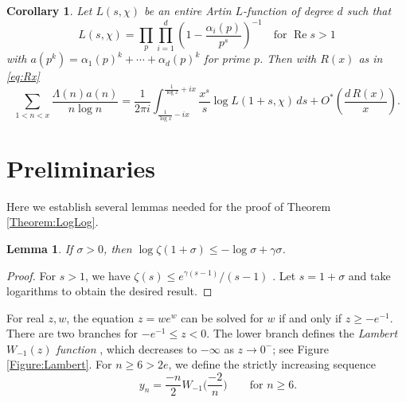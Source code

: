 \documentclass[10pt,reqno]{amsart}
\theoremstyle{plain}
\newtheorem{corollary}[theorem]{Corollary}
\newtheorem{lemma}[theorem]{Lemma}
\theoremstyle{definition}
\renewcommand{\Re}{\operatorname{Re}}
\begin{document}
\begin{corollary}\label{cor:loglog}
Let $L(s, \chi)$ be an entire Artin $L$-function of degree $d$ such that 
\begin{equation*}
    L(s,\chi) = \prod_{p}\prod_{i=1}^{d} \left(1 - \frac{\alpha_i(p)}{p^s}\right)^{-1} 
    \quad \text{for $\Re s > 1$}
\end{equation*}
with $a(p^k) = \alpha_1(p)^k + \cdots + \alpha_d(p)^k$ for prime $p$.  Then with $R(x)$ as in \eqref{eq:Rx}
\begin{equation*}
    \sum_{1<n < x} \frac{\Lambda(n) a(n)}{n \log{n}} 
    = \frac{1}{2\pi i }\int_{\tfrac{1}{\log{x}}-ix}^{\tfrac{1}{\log{x}}+ix} \frac{x^s}{s} \log{L(1+s,\chi)}\,ds + 
    O^*\!\left( \frac{d\,R(x)}{x} \right).
\end{equation*}
\end{corollary}


\section{Preliminaries}\label{Section:Lemmas}
Here we establish several lemmas needed for the proof of Theorem \ref{Theorem:LogLog}.

\begin{lemma}\label{Lemma:Stieltjes}
    If $\sigma >0$, then $\log \zeta(1+\sigma) \leq - \log \sigma + \gamma \sigma$.
\end{lemma}

\begin{proof}
For $s> 1$, we have $\zeta(s) \leq e^{\gamma(s-1)}/(s-1)$ \cite[Lem.~5.4]{RamareExplicitDensity}.
Let $s = 1+\sigma$ and take logarithms to obtain the desired result.
\end{proof}


For real $z,w$, the equation $z = we^w$ can be solved for $w$ if and only if $z \geq -e^{-1}$.  There are two branches
for $-e^{-1} \leq z < 0$.  The lower branch defines
the \emph{Lambert $W_{-1}(z)$ function} \cite{Lambert}, 
which decreases to $-\infty$ as $z\to 0^-$; see Figure \ref{Figure:Lambert}.
For $n \geq 6>2e$, we define the strictly increasing sequence
\begin{equation}\label{eq:Yin}\qquad
y_n = \frac{-n}{2} W_{-1}\Big( \frac{-2}{n} \Big) \qquad \text{for $n \geq 6$}.
\end{equation}
\end{document}
